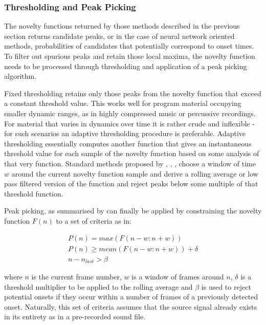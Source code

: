 \subsubsection{Thresholding and Peak Picking}
\label{sec:peak_picking}

The novelty functions returned by those methods described in the previous section returns candidate peaks, or in the case of neural network oriented methods, probabilities of candidates that potentially correspond to onset times. To filter out spurious peaks and retain those local maxima, the novelty function needs to be processed through thresholding and application of a peak picking algorithm. 

Fixed thresholding retains only those peaks from the novelty function that exceed a constant threshold value. This works well for program material occupying smaller dynamic ranges, as in highly compressed music or percussive recordings. For material that varies in dynamics over time it is rather crude and inflexible - for such scenarios an adaptive thresholding procedure is preferable. Adaptive thresholding essentially computes another function that gives an instantaneous threshold value for each sample of the novelty function based on some analysis of that very function. Standard methods proposed by
\cite{Bello2005b}, \cite{Dixon2006}, \cite{Bock2012a, Bock2013}, choose a window of time $w$ around the current novelty function sample and derive a rolling average or low pass filtered version of the function and reject peaks below some multiple of that threshold function.

Peak picking, as summarised by \cite{Bock2012a} can finally be applied by constraining the novelty function $F(n)$ to a set of criteria as in:

\begin{equation}
  \label{eq:peak_picking}
  \begin{gathered}
P(n)=max(F(n-w:n+w))\\
P(n)\geq mean(F(n-w:n+w))+\delta\\
n-n_{last}>\beta
  \end{gathered}
\end{equation}

where $n$ is the current frame number, $w$ is a window of frames around $n$, $\delta$ is a threshold multiplier to be applied to the rolling average and $\beta$ is used to reject potential onsets if they occur within a number of frames of a previously detected onset. Naturally, this set of criteria assumes that the source signal already exists in its entirety as in a pre-recorded sound file.

